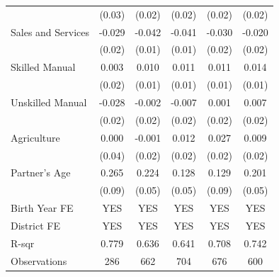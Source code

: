 \begin{longtable}{l*{5}{c}}
                    & (0.03) & (0.02) & (0.02) & (0.02) & (0.02) \\
\hspace{1em}Sales and Services & -0.029 & -0.042\sym{***} & -0.041\sym{***} & -0.030\sym{*} & -0.020 \\
                    & (0.02) & (0.01) & (0.01) & (0.02) & (0.02) \\
\hspace{1em}Skilled Manual & 0.003 & 0.010 & 0.011 & 0.011 & 0.014 \\
                    & (0.02) & (0.01) & (0.01) & (0.01) & (0.01) \\
\hspace{1em}Unskilled Manual & -0.028 & -0.002 & -0.007 & 0.001 & 0.007 \\
                    & (0.02) & (0.02) & (0.02) & (0.02) & (0.02) \\
\hspace{1em}Agriculture & 0.000 & -0.001 & 0.012 & 0.027 & 0.009 \\
                    & (0.04) & (0.02) & (0.02) & (0.02) & (0.02) \\
Partner's Age & 0.265\sym{***} & 0.224\sym{***} & 0.128\sym{**} & 0.129 & 0.201\sym{***} \\
                    & (0.09) & (0.05) & (0.05) & (0.09) & (0.05) \\
\hline
Birth Year FE & YES & YES & YES & YES & YES \\
District FE & YES & YES & YES & YES & YES \\
R-sqr & 0.779 & 0.636 & 0.641 & 0.708 & 0.742 \\
Observations & 286 & 662 & 704 & 676 & 600 \\
\hline \hline

\end{longtable}